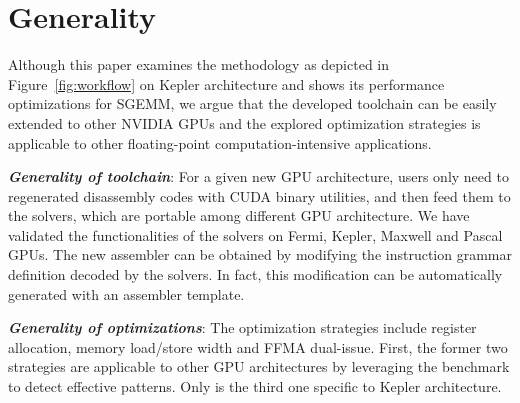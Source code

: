 \section{Generality}
\label{sec:generality}

Although this paper examines the methodology as depicted in Figure~\ref{fig:workflow} on Kepler architecture and shows its performance optimizations for SGEMM, we argue that the developed toolchain can be easily extended to other NVIDIA GPUs and the explored optimization strategies is applicable to other floating-point computation-intensive applications.

{\em {\bf Generality of toolchain}}: For a given new GPU architecture, users only need to regenerated disassembly codes with CUDA binary utilities, and then feed them to the solvers, which are portable among different GPU architecture. We have validated the functionalities of the solvers on Fermi, Kepler, Maxwell and Pascal GPUs. The new assembler can be obtained by modifying the instruction grammar definition decoded by the solvers. In fact, this modification can be automatically generated with an assembler template. %

{\em {\bf Generality of optimizations}}: The optimization strategies include register allocation, memory load/store width and FFMA dual-issue. First, the former two strategies are applicable to other GPU architectures by leveraging the benchmark to detect effective patterns. Only is the third one specific to Kepler architecture. 


